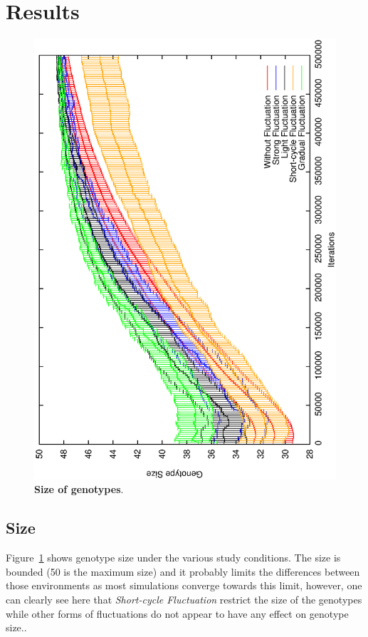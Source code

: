 \documentclass[letterpaper]{article}
\begin{document}
\section{Results}\label{sec:results}
\begin{figure}[h]
\centering
\includegraphics[width=0.7\columnwidth, angle =-90 ]{img/Size}
\caption{\textbf{Size of genotypes}. 
}
\label{fig:Size}
\end{figure}

\subsection{Size}
Figure~\ref{fig:Size} shows genotype size under the various study conditions. The size is bounded (50 is the maximum size) and it probably limits the differences between those environments as most simulations converge towards this limit, however, one can clearly see here that \emph{Short-cycle Fluctuation} restrict the size of the genotypes while other forms of fluctuations do not appear to have any effect on genotype size..
\end{document}
